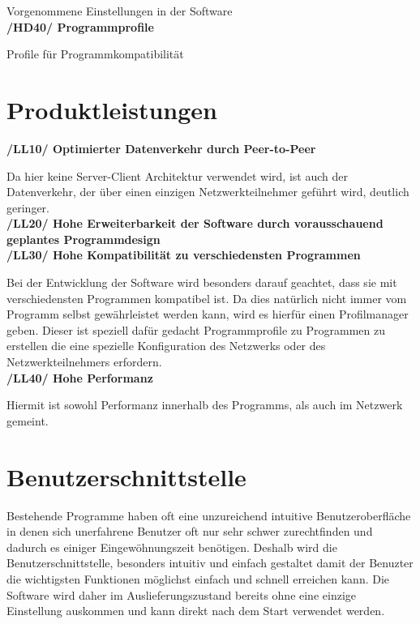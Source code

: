 \documentclass[a4paper,12pt]{scrreprt}
\begin{document}
	Vorgenommene Einstellungen in der Software\\
	\textbf {/HD40/ Programmprofile}
	
	Profile für Programmkompatibilität

\chapter{Produktleistungen}
	\textbf{/LL10/ Optimierter Datenverkehr durch Peer-to-Peer}
	
		Da hier keine Server-Client Architektur verwendet wird, ist auch der Datenverkehr, der über einen einzigen Netzwerkteilnehmer geführt wird, deutlich geringer.\\
	\textbf{/LL20/ Hohe Erweiterbarkeit der Software durch vorausschauend geplantes Programmdesign}
	\\\textbf{/LL30/ Hohe Kompatibilität zu verschiedensten Programmen}
	
		Bei der Entwicklung der Software wird besonders darauf geachtet, dass sie mit verschiedensten Programmen kompatibel ist. Da dies natürlich nicht immer vom Programm selbst gewährleistet werden kann, wird es hierfür einen Profilmanager geben. Dieser ist speziell dafür gedacht Programmprofile zu Programmen zu erstellen die eine spezielle Konfiguration des Netzwerks oder des Netzwerkteilnehmers erfordern.
	\\\textbf{/LL40/ Hohe Performanz}
	
		Hiermit ist sowohl Performanz innerhalb des Programms, als auch im Netzwerk gemeint.
	
	
	
	
\chapter{Benutzerschnittstelle}
	Bestehende Programme haben oft eine unzureichend intuitive Benutzeroberfläche in denen sich unerfahrene Benutzer oft nur sehr schwer zurechtfinden und dadurch es einiger Eingewöhnungszeit benötigen. Deshalb wird die Benutzerschnittstelle, besonders intuitiv und einfach gestaltet damit der Benuzter die wichtigsten Funktionen möglichst einfach und schnell erreichen kann. Die Software wird daher im Auslieferungszustand bereits ohne eine einzige Einstellung auskommen und kann direkt nach dem Start verwendet werden.
	
	
\end{document}
